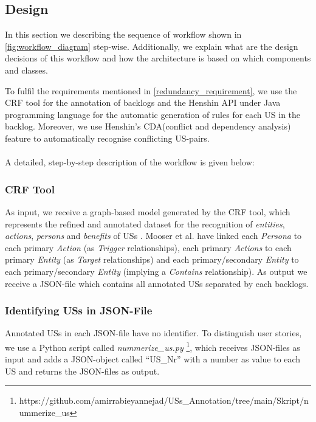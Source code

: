 \subsection{Design}\label{desing}
In this section we describing the sequence of workflow shown in \ref{fig:workflow_diagram} step-wise. Additionally, we explain what are the design decisions of this workflow and how the architecture is based on which components and classes.

To fulfil the requirements mentioned in \ref{redundancy_requirement}, we use the CRF tool \cite{mosser2022modelling} for the annotation of backlogs and the Henshin API \cite{arendt2010henshin} under Java programming language for the automatic generation of rules for each US in the backlog. Moreover, we use Henshin's CDA(conflict and dependency analysis) feature \cite{mens2007analysing} to automatically recognise conflicting US-pairs.\\\\
A detailed, step-by-step description of the workflow is given below:
\subsubsection*{CRF Tool}\label{workflow_crf}
As input, we receive a graph-based model generated by the CRF tool, which represents the refined and annotated dataset for the recognition of \emph{entities}, \emph{actions}, \emph{persons} and \emph{benefits} of USs \cite{mosser2022modelling}. Mooser et al. have linked each \emph{Persona} to each primary \emph{Action} (as \emph{Trigger} relationships), each primary \emph{Actions} to each primary \emph{Entity} (as \emph{Target} relationships) and each primary/secondary \emph{Entity} to each primary/secondary \emph{Entity} (implying a \emph{Contains} relationship)\cite{arulmohan2023extracting}. As output we receive a JSON-file which contains all annotated USs separated by each backlogs.
\subsubsection*{Identifying USs in JSON-File}\label{workflow_nummerize_us}
Annotated USs in each JSON-file have no identifier. To distinguish user stories, we use a Python script called \textit{nummerize\_us.py} \footnote{https://github.com/amirrabieyannejad/USs\_Annotation/tree/main/Skript/nummerize\_us}, which receives JSON-files as input and adds a JSON-object called \enquote{US\_Nr} with a number as value to each US and returns the JSON-files as output.
